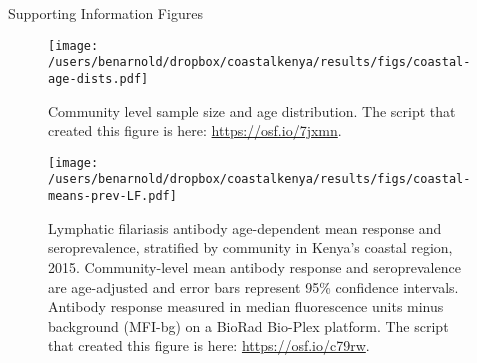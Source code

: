 \documentclass[11pt]{article}
\begin{document}
\clearpage
\renewcommand{\thefigure}{S\arabic{figure} }
\setcounter{figure}{0} 
{\LARGE Supporting Information Figures}
\clearpage

\begin{figure}[htbp]
\begin{center}
\texttt{[image: /users/benarnold/dropbox/coastalkenya/results/figs/coastal-age-dists.pdf]} 
\begin{minipage}{0.75\textwidth}
\caption{Community level sample size and age distribution. The script that created this figure is here: \url{https://osf.io/7jxmn}.}
\label{fig:agedist}
\end{minipage}
\end{center}
\end{figure}


\begin{landscape}
\begin{figure}[htbp]
\begin{center}
\texttt{[image: /users/benarnold/dropbox/coastalkenya/results/figs/coastal-means-prev-LF.pdf]} 
\begin{minipage}{1.2\textwidth}
\caption{Lymphatic filariasis antibody age-dependent mean response and seroprevalence, stratified by community in Kenya's coastal region, 2015. Community-level mean antibody response and seroprevalence are age-adjusted and error bars represent 95\% confidence intervals. Antibody response measured in median fluorescence units minus background (MFI-bg) on a BioRad Bio-Plex platform. The script that created this figure is here: \url{https://osf.io/c79rw}. \label{fig:LFbigfig}}
\end{minipage}
\end{center}
\end{figure}
\end{landscape}
\end{document}
